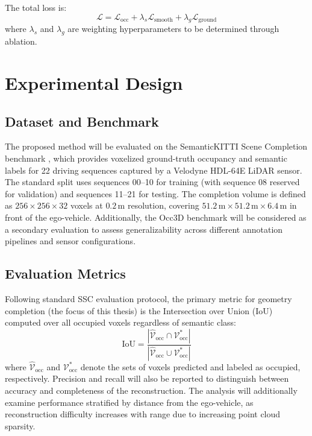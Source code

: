 \documentclass[a4paper, 12pt]{article}
\begin{document}
	The total loss is:
	\begin{equation}
		\mathcal{L} = \mathcal{L}_{\text{occ}} + \lambda_s \mathcal{L}_{\text{smooth}}
		+ \lambda_g \mathcal{L}_{\text{ground}}
	\end{equation}
	where $\lambda_s$ and $\lambda_g$ are weighting hyperparameters to be
	determined through ablation.
	
	\section{Experimental Design}
	
	\subsection{Dataset and Benchmark}
	
	The proposed method will be evaluated on the SemanticKITTI Scene Completion
	benchmark \cite{Behley_2019_ICCV, 10802143}, which provides voxelized
	ground-truth occupancy and semantic labels for 22 driving sequences captured
	by a Velodyne HDL-64E LiDAR sensor. The standard split uses sequences 00--10
	for training (with sequence 08 reserved for validation) and sequences 11--21
	for testing. The completion volume is defined as $256 \times 256 \times 32$
	voxels at $0.2\,\text{m}$ resolution, covering $51.2\,\text{m} \times
	51.2\,\text{m} \times 6.4\,\text{m}$ in front of the ego-vehicle.
	Additionally, the Occ3D benchmark \cite{NEURIPS2023_cabfaeec} will be
	considered as a secondary evaluation to assess generalizability across
	different annotation pipelines and sensor configurations.
	
	\subsection{Evaluation Metrics}
	
	Following standard SSC evaluation protocol, the primary metric for geometry
	completion (the focus of this thesis) is the Intersection over Union (IoU)
	computed over all occupied voxels regardless of semantic class:
	\begin{equation}
		\text{IoU} = \frac{|\hat{\mathcal{V}}_{\text{occ}} \cap \mathcal{V}^*_{\text{occ}}|}
		{|\hat{\mathcal{V}}_{\text{occ}} \cup \mathcal{V}^*_{\text{occ}}|}
	\end{equation}
	where $\hat{\mathcal{V}}_{\text{occ}}$ and $\mathcal{V}^*_{\text{occ}}$
	denote the sets of voxels predicted and labeled as occupied, respectively.
	Precision and recall will also be reported to distinguish between accuracy
	and completeness of the reconstruction. The analysis will additionally
	examine performance stratified by distance from the ego-vehicle, as
	reconstruction difficulty increases with range due to increasing point cloud
	sparsity.
	
\end{document}
